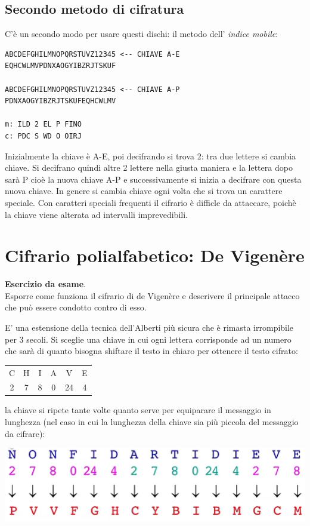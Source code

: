 \subsection{Secondo metodo di cifratura} C'è un secondo modo per usare questi dischi: il metodo dell' \emph{indice mobile}:
\begin{verbatim}
ABCDEFGHILMNOPQRSTUVZ12345 <-- CHIAVE A-E
EQHCWLMVPDNXAOGYIBZRJTSKUF

ABCDEFGHILMNOPQRSTUVZ12345 <-- CHIAVE A-P
PDNXAOGYIBZRJTSKUFEQHCWLMV

m: ILD 2 EL P FINO
c: PDC S WD O OIRJ
\end{verbatim}
Inizialmente la chiave è A-E, poi decifrando si trova 2: tra due lettere si cambia chiave. Si decifrano quindi altre 2 lettere nella giusta maniera e la lettera dopo sarà P cioè la nuova chiave A-P e successivamente si inizia a decifrare con questa nuova chiave. In genere si cambia chiave ogni volta che si trova un carattere speciale. Con caratteri speciali frequenti il cifrario è difficle da attaccare, poichè la chiave viene alterata ad intervalli imprevedibili.
\clearpage 

\section{Cifrario polialfabetico: De Vigenère}
\begin{framed}
\noindent \textbf{Esercizio da esame}.\\
Esporre come funziona il cifrario di de Vigenère e descrivere il principale attacco che può essere
condotto contro di esso.
\end{framed} 
E' una estensione della tecnica dell'Alberti più sicura che è rimasta irrompibile per 3 secoli. Si sceglie una chiave in cui ogni lettera corrisponde ad un numero che sarà di quanto bisogna shiftare il testo in chiaro per ottenere il testo cifrato:
\begin{table}[ht!]
    \centering
    \begin{tabular}{c c c c c c}
        C & H & I & A & V & E \\
        2 & 7 & 8 & 0 & 24 & 4
    \end{tabular}
\end{table}
la chiave si ripete tante volte quanto serve per equiparare il messaggio in lunghezza (nel caso in cui la lunghezza della chiave sia più piccola del messaggio da cifrare):
\begin{center}
	\includegraphics{images/9.PNG}
\end{center}

